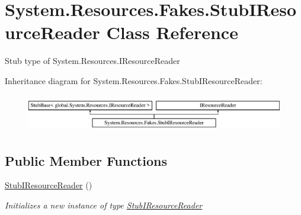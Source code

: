\hypertarget{class_system_1_1_resources_1_1_fakes_1_1_stub_i_resource_reader}{\section{System.\-Resources.\-Fakes.\-Stub\-I\-Resource\-Reader Class Reference}
\label{class_system_1_1_resources_1_1_fakes_1_1_stub_i_resource_reader}
}


Stub type of System.\-Resources.\-I\-Resource\-Reader 


Inheritance diagram for System.\-Resources.\-Fakes.\-Stub\-I\-Resource\-Reader\-:\begin{figure}[H]
\begin{center}
\leavevmode
\includegraphics[height=1.642229cm]{class_system_1_1_resources_1_1_fakes_1_1_stub_i_resource_reader}
\end{center}
\end{figure}
\subsection*{Public Member Functions}
\begin{DoxyCompactItemize}
\item 
\hyperlink{class_system_1_1_resources_1_1_fakes_1_1_stub_i_resource_reader_aa43ad72d3a215d12b80b60d2330d7c16}{Stub\-I\-Resource\-Reader} ()
\begin{DoxyCompactList}\small\item\em Initializes a new instance of type \hyperlink{class_system_1_1_resources_1_1_fakes_1_1_stub_i_resource_reader}{Stub\-I\-Resource\-Reader}\end{DoxyCompactList}\end{DoxyCompactItemize}
